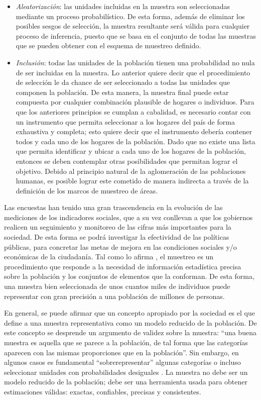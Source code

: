 \documentclass[
  12pt,
  spanish,
]{book}
\providecommand{\tightlist}{%
  \setlength{\itemsep}{0pt}\setlength{\parskip}{0pt}}
\begin{document}
\begin{itemize}
\tightlist
\item
  \emph{Aleatorización}: las unidades incluidas en la muestra son seleccionadas mediante un proceso probabilístico. De esta forma, además de eliminar los posibles sesgos de selección, la muestra resultante será válida para cualquier proceso de inferencia, puesto que se basa en el conjunto de todas las muestras que se pueden obtener con el esquema de muestreo definido.
\item
  \emph{Inclusión}: todas las unidades de la población tienen una probabilidad no nula de ser incluidas en la muestra. Lo anterior quiere decir que el procedimiento de selección le da chance de ser seleccionado a todas las unidades que componen la población. De esta manera, la muestra final puede estar compuesta por cualquier combinación plausible de hogares o individuos.
  Para que los anteriores principios se cumplan a cabalidad, es necesario contar con un instrumento que permita seleccionar a los hogares del país de forma exhaustiva y completa; esto quiere decir que el instrumento debería contener todos y cada uno de los hogares de la población. Dado que no existe una lista que permita identificar y ubicar a cada uno de los hogares de la población, entonces se deben contemplar otras posibilidades que permitan lograr el objetivo. Debido al principio natural de la aglomeración de las poblaciones humanas, es posible lograr este cometido de manera indirecta a través de la definición de los marcos de muestreo de áreas.
\end{itemize}

Las encuestas han tenido una gran trascendencia en la evolución de las mediciones de los indicadores sociales, que a su vez conllevan a que los gobiernos realicen un seguimiento y monitoreo de las cifras más importantes para la sociedad. De esta forma se podrá investigar la efectividad de las políticas públicas, para concretar las metas de mejora en las condiciones sociales y/o económicas de la ciudadanía. Tal como lo afirma \citet{Gutierrez_2016}, el muestreo es un procedimiento que responde a la necesidad de información estadística precisa sobre la población y los conjuntos de elementos que la conforman. De esta forma, una muestra bien seleccionada de unos cuantos miles de individuos puede representar con gran precisión a una población de millones de personas.

En general, se puede afirmar que un concepto apropiado por la sociedad es el que define a una muestra representativa como un modelo reducido de la población. De este concepto se desprende un argumento de validez sobre la muestra: ``una buena muestra es aquella que se parece a la población, de tal forma que las categorías aparecen con las mismas proporciones que en la población''. Sin embargo, en algunos casos es fundamental ``sobrerepresentar'' algunas categorías o incluso seleccionar unidades con probabilidades desiguales \citep{Tille2006}. La muestra no debe ser un modelo reducido de la población; debe ser una herramienta usada para obtener estimaciones válidas: exactas, confiables, precisas y consistentes.
\end{document}
